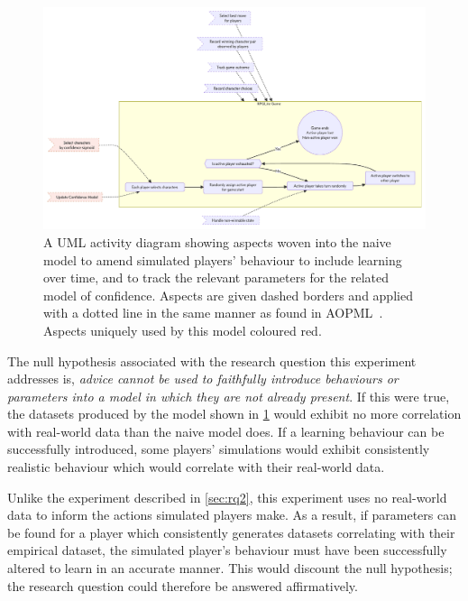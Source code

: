 \begin{figure}[h]
  \centering
  \includegraphics[width=\columnwidth]{70_generality_of_aspects/diagrams/exp3_learning_model.pdf}
  \caption{A UML activity diagram showing aspects woven into the naive model to amend simulated players'
  behaviour to include learning over time, and to track the relevant parameters
  for the related model of confidence. Aspects are given dashed borders and
  applied with a dotted line in the same manner as found in
  AOPML~\cite{Cappelli_AOBPM}. Aspects uniquely used by this model
  coloured red.}
  \label{fig:learning_model_software_diagram}
\end{figure}

The null hypothesis associated with the research question this experiment
addresses is, \emph{advice cannot be used to faithfully introduce behaviours or
parameters into a model in which they are not already present}. If this were
true, the datasets produced by the \aspectoriented model shown in
\cref{fig:learning_model_software_diagram} would exhibit no more correlation with
real-world data than the naive model does. If a learning behaviour can be
successfully introduced, some players' simulations would exhibit consistently
realistic behaviour which would correlate with their real-world data.

Unlike the experiment described in \cref{sec:rq2}, this experiment uses no
real-world data to inform the actions simulated players make. As a result, if
parameters can be found for a player which consistently generates datasets
correlating with their empirical dataset, the simulated player's behaviour must
have been successfully altered to learn in an accurate manner. This would
discount the null hypothesis; the research question could therefore be answered
affirmatively.





